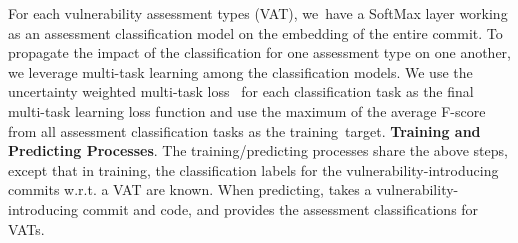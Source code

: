 
For each vulnerability assessment types (VAT), we~have a
SoftMax layer working as an assessment classification model on the
embedding of the entire commit.
%
%
To propagate the impact of the classification for one
assessment type on one another, we leverage multi-task learning among
the classification models. We use the uncertainty weighted multi-task
loss~\cite{kendall2018multi} for each classification task as the final
multi-task learning loss function and use the maximum of the average
F-score from all assessment classification tasks as the
training~target. {\bf Training and Predicting Processes}. The training/predicting processes share the above steps, except
that in training, the classification labels for the
vulnerability-introducing commits w.r.t. a VAT are known. When
predicting, {\tool} takes a vulnerability-introducing commit and code, and provides the assessment classifications for
VATs.        

